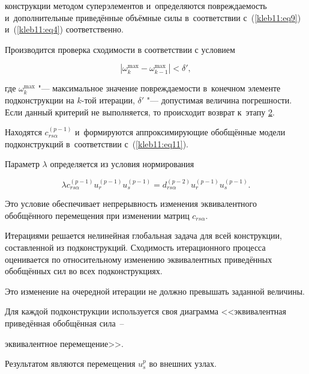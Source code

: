 \begin{description}[{\sc Этап 0.}]
конструкции методом суперэлементов и~определяются повреждаемость и~дополнительные приведённые объёмные силы в~соответствии с~(\ref{kleb11:eq9}) и~(\ref{kleb11:eq4}) соответственно.



\item[{\sc Этап 4.}] Производится проверка сходимости в соответствии с условием

\[

\left| \omega_k^{\max} -\omega_{k-1}^{\max} \right|< \delta',

\]

где $\omega_k^{\max} $ "--- максимальное значение повреждаемости в~конечном элементе подконструкции на $k$-той итерации, $\delta'$ "--- допустимая величина погрешности. Если данный критерий не выполняется, то происходит возврат к~этапу \hyperlink{et:2}{2}.





\item[\hypertarget{et:5}{\sc Этап 5.}] Находятся $c_{rs\alpha}^{(p-1)}$ и~формируются аппроксимирующие обобщённые модели подконструкций в~соответствии с~(\ref{kleb11:eq11}).

Параметр $\lambda$ определяется из условия нормирования

\[

\lambda c_{rs\alpha}^{(p-1)} u_r^{(p-1)} u_s^{(p-1)} =d_{rs\alpha}^{(p-2)} u_r^{(p-1)} u_s^{(p-1)}.

\]

Это условие обеспечивает непрерывность изменения эквивалентного обобщённого перемещения при изменении матриц $c_{rs\alpha}$.





\item[\hypertarget{et:6}{\sc Этап 6.}] Итерациями решается нелинейная глобальная задача для всей конструкции, составленной из подконструкций. Сходимость итерационного процесса оценивается по относительному изменению эквивалентных приведённых обобщённых сил во всех подконструкциях. 

Это изменение на очередной итерации не должно превышать заданной величины. 

Для каждой подконструкции используется своя диаграмма <<эквивалентная приведённая обобщённая сила~--

эквивалентное перемещение>>. 

Результатом являются перемещения $u_s^p$ во внешних узлах.






\end{description}

